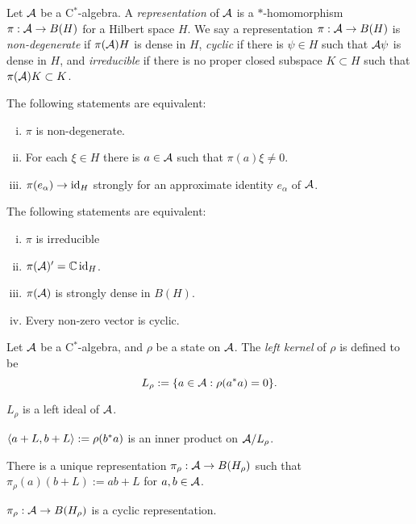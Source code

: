 \documentclass{../../large}
\begin{document}
\begin{prb}
Let $\mathcal{A}$ be a C$^*$-algebra.
A \emph{representation} of $\mathcal{A}$ is a $*$-homomorphism $\pi:\mathcal{A}\to B(H)$ for a Hilbert space $H$.
We say a representation $\pi:\mathcal{A}\to B(H)$ is \emph{non-degenerate} if $\pi(\mathcal{A})H$ is dense in $H$, \emph{cyclic} if there is $\psi\in H$ such that $\mathcal{A}\psi$ is dense in $H$, and \emph{irreducible} if there is no proper closed subspace $K\subset H$ such that $\pi(\mathcal{A})K\subset K$.
\begin{parts}
\item The following statements are equivalent:
\begin{enumerate}[(i)]
\item $\pi$ is non-degenerate.
\item For each $\xi\in H$ there is $a\in\mathcal{A}$ such that $\pi(a)\xi\ne0$.
\item $\pi(e_\alpha)\to\operatorname{id}_H$ strongly for an approximate identity $e_\alpha$ of $\mathcal{A}$.
\end{enumerate}

\item The following statements are equivalent:
\begin{enumerate}[(i)]
\item $\pi$ is irreducible
\item $\pi(\mathcal{A})'=\mathbb{C}\operatorname{id}_H$.
\item $\pi(\mathcal{A})$ is strongly dense in $B(H)$.
\item Every non-zero vector is cyclic.
\end{enumerate}
\end{parts}
\end{prb}


\begin{prb}
Let $\mathcal{A}$ be a C$^*$-algebra, and $\rho$ be a state on $\mathcal{A}$.
The \emph{left kernel} of $\rho$ is defined to be
\[L_\rho:=\{a\in\mathcal{A}:\rho(a^*a)=0\}.\]
\begin{parts}
\item $L_\rho$ is a left ideal of $\mathcal{A}$.
\item $\langle a+L,b+L\rangle:=\rho(b^*a)$ is an inner product on $\mathcal{A}/L_\rho$.
\item There is a unique representation $\pi_\rho:\mathcal{A}\to B(H_\rho)$ such that $\pi_\rho(a)(b+L):=ab+L$ for $a,b\in\mathcal{A}$.
\item $\pi_\rho:\mathcal{A}\to B(H_\rho)$ is a cyclic representation.
\end{parts}
\end{prb}
\end{document}
